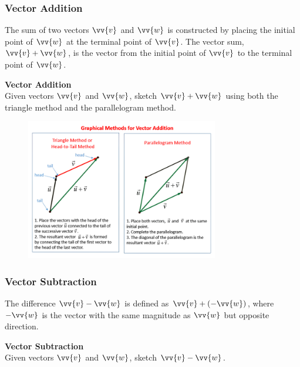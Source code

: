 \documentclass{article}
\begin{document}
\subsubsection*{Vector Addition}

The sum of two vectors \(\vv{v}\) and \(\vv{w}\) is constructed by placing the initial point of \(\vv{w}\) at the terminal point of \(\vv{v}\). The vector sum, \(\vv{v} + \vv{w}\), is the vector from the initial point of \(\vv{v}\) to the terminal point of \(\vv{w}\).

\begin{exercisebox}
    \textbf{Vector Addition} \\
    Given vectors \(\vv{v}\) and \(\vv{w}\), sketch \(\vv{v} + \vv{w}\) using both the triangle method and the parallelogram method.
    \begin{figure}[H]
        \centering
        \includegraphics[width=0.75\textwidth]{add-vectors.png}
    \end{figure}
\end{exercisebox}

\subsubsection*{Vector Subtraction}

The difference \(\vv{v} - \vv{w}\) is defined as \(\vv{v} + (-\vv{w})\), where \(-\vv{w}\) is the vector with the same magnitude as \(\vv{w}\) but opposite direction.

\begin{exercisebox}
    \textbf{Vector Subtraction} \\
    Given vectors \(\vv{v}\) and \(\vv{w}\), sketch \(\vv{v} - \vv{w}\).
\end{exercisebox}
\end{document}
